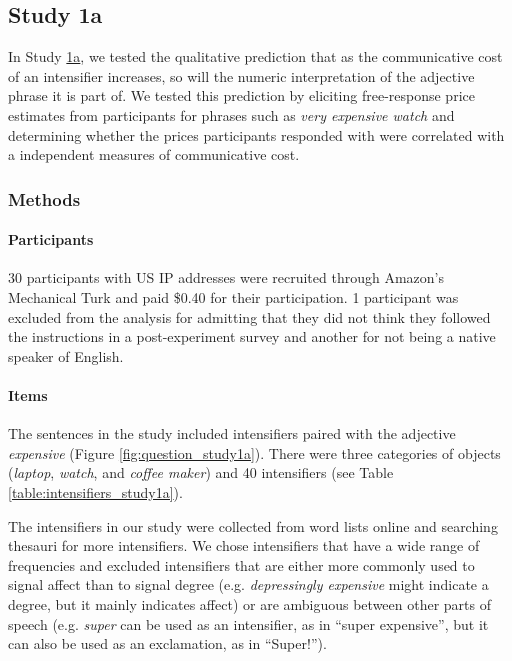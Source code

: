 \documentclass[10pt,letterpaper]{article}
\newcommand{\w}[1]{\emph{#1}}
\begin{document}
\subsection{Study 1a \label{sec:study1a}}

In Study \hyperref[sec:study1a]{1a}, we tested the qualitative prediction that as the communicative cost of an intensifier increases, so will the numeric interpretation of the adjective phrase it is part of.
We tested this prediction by eliciting free-response price estimates from participants for phrases such as \w{very expensive watch} and determining whether the prices participants responded with were correlated with a independent measures of communicative cost.

\subsubsection{Methods}

\paragraph{Participants}

30 participants with US IP addresses were recruited through Amazon’s Mechanical Turk and paid \$0.40 for their participation. 1 participant was excluded from the analysis for admitting that they did not think they followed the instructions in a post-experiment survey and another for not being a native speaker of English.

\paragraph{Items}

The sentences in the study included intensifiers paired with the adjective \w{expensive} (Figure \ref{fig:question_study1a}).
There were three categories of objects (\w{laptop}, \w{watch}, and \w{coffee maker}) and 40 intensifiers (see Table \ref{table:intensifiers_study1a}).

The intensifiers in our study were collected from word lists online and searching thesauri for more intensifiers.
We chose intensifiers that have a wide range of frequencies and excluded intensifiers that are either more commonly used to signal affect than to signal degree (e.g. \w{depressingly expensive} might indicate a degree, but it mainly indicates affect) or are ambiguous between other parts of speech (e.g. \w{super} can be used as an intensifier, as in ``super expensive'', but it can also be used as an exclamation, as in ``Super!'').
\end{document}
